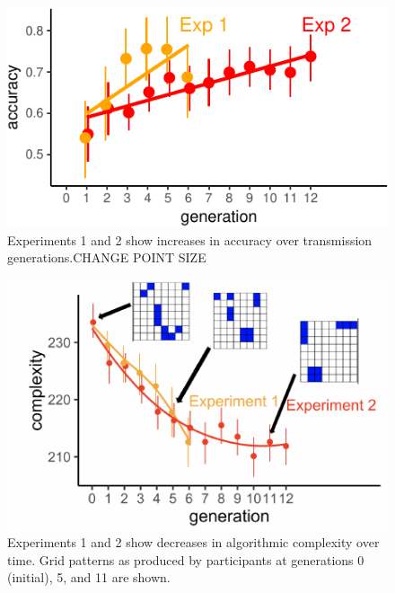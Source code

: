 \documentclass[10pt, letterpaper]{article}
\newenvironment{CodeChunk}{}{}
\begin{document}
\begin{CodeChunk}
\begin{figure}[tb]

{\centering \includegraphics{figs/baseline_bothAccuracy-1} 

}

\caption[Experiments 1 and 2 show increases in accuracy over transmission generations.CHANGE POINT SIZE]{Experiments 1 and 2 show increases in accuracy over transmission generations.CHANGE POINT SIZE}\label{fig:baseline_bothAccuracy}
\end{figure}
\end{CodeChunk}

\begin{CodeChunk}
\begin{figure}[tb]

{\centering \includegraphics{figs/baseline_bothExp_withplots-1} 

}

\caption[Experiments 1 and 2 show decreases in algorithmic complexity over time]{Experiments 1 and 2 show decreases in algorithmic complexity over time. Grid patterns as produced by participants at generations 0 (initial), 5, and 11 are shown.}\label{fig:baseline_bothExp_withplots}
\end{figure}
\end{CodeChunk}
\end{document}
